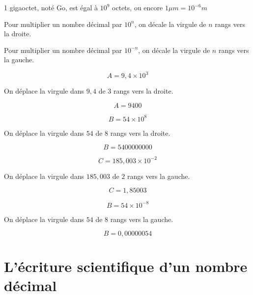 \documentclass[a4paper,10pt]{report}
\begin{document}
\vspace{-4mm}
\begin{ex}
1 gigaoctet, noté Go, est égal à $10^{9}$ octets, \quad ou encore $1 \mu m = 10^{-6} m$
\end{ex}

\begin{prop}
Pour multiplier un nombre décimal par $10^{n}$, on décale la virgule de $n$ rangs vers la droite.

\vspace{1mm}
\noindent Pour multiplier un nombre décimal par $10^{-n}$, on décale la virgule de $n$ rangs vers la gauche.
\end{prop}

\begin{meth}

\vspace{-4mm}
\noindent \begin{minipage}{4cm}
$$A =  9,4\times 10^{3}$$

On déplace la virgule dans $9,4$ de $3$ rangs vers la droite.

$$A  = 9 400$$
\end{minipage}
\hspace{1mm}
\vline
\hspace{1mm}
\begin{minipage}{4cm}
$$B = 54\times 10^{8}$$

On déplace la virgule dans $54$ de $8$ rangs vers la droite.

$$B = 5 400 000 000$$
\end{minipage}
\hspace{1mm}
\vline
\hspace{1mm}
\begin{minipage}{4cm}
$$C = 185,003\times 10^{-2}$$

On déplace la virgule dans $185,003$ de $2$ rangs vers la gauche.

$$C = 1,85003$$
\end{minipage}
\hspace{1mm}
\vline
\hspace{1mm}
\begin{minipage}{4cm}
$$B = 54\times 10^{-8}$$

On déplace la virgule dans $54$ de $8$ rangs vers la gauche.

$$B = 0,00000054$$
\end{minipage}
\end{meth}

\vspace{-4mm}
\section{L'écriture scientifique d'un nombre décimal}
\end{document}
